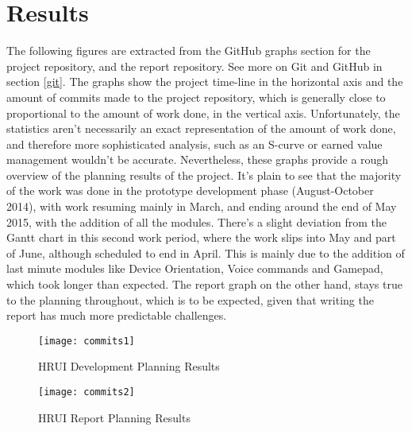 \section{Results}
The following figures are extracted from the GitHub graphs section for the project repository, and the report repository. 
See more on Git and GitHub in section \ref{git}. The graphs show the project time-line in the horizontal axis and the 
amount of commits made to the project repository, which is generally close to proportional to the amount of work done, in 
the vertical axis. Unfortunately, the statistics aren't necessarily an exact representation of the amount of work done, and 
therefore more sophisticated analysis, such as an S-curve or earned value management wouldn't be accurate. Nevertheless, 
these graphs provide a rough overview of the planning results of the project. It's plain to see that the majority of the 
work was done in the prototype development phase (August-October 2014), with work resuming mainly in March, and ending 
around the end of May 2015, with the addition of all the modules. There's a slight deviation from the Gantt chart in this 
second work period, where the work slips into May and part of June, although scheduled to end in April. This is mainly due 
to the addition of last minute modules like Device Orientation, Voice commands and Gamepad, which took longer than 
expected. The report graph on the other hand, stays true to the planning throughout, which is to be expected, given that 
writing the report has much more predictable challenges.\\
\begin{figure}[H]
\centering
\captionsetup{justification=centering}
\texttt{[image: commits1]}
\caption{HRUI Development Planning Results}
\end{figure}
\begin{figure}[H]
\centering
\captionsetup{justification=centering}
\texttt{[image: commits2]}
\caption{HRUI Report Planning Results}
\end{figure}